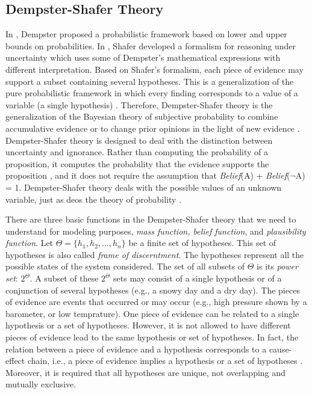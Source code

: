 \documentclass[11pt]{article}
\begin{document}
\subsection{Dempster-Shafer Theory}

In \cite{dempster:theory}, Dempster proposed a probabilistic framework based on
lower and upper bounds on probabilities. In \cite{shafer:evidence-theory},
Shafer developed a formalism for reasoning under uncertainty which uses some of
Dempster's mathematical expressions with different interpretation. Based on
Shafer's formalism, each piece of evidence may support a subset containing
several hypotheses. This is a generalization of the pure probabilistic framework
in which every finding corresponds to a value of a variable (a single
hypothesis) \cite{diez:reasoning-uncertainty}. Therefore, Dempster-Shafer theory
is the generalization of the Bayesian theory of subjective probability to
combine accumulative evidence or to change prior opinions in the light of new
evidence \cite{das:decision-making-agents}. Dempster-Shafer theory is designed
to deal with the distinction between uncertainty and ignorance. Rather than
computing the probability of a proposition, it computes the probability that the
evidence supports the proposition \cite{russell:ai-modern}, and it does not
require the assumption that \textit{Belief}(A) + \textit{Belief}($\neg$A) = 1.
Dempster-Shafer theory deals with the possible values of an unknown variable,
just as deos the theory of probability \cite{tanimoto:ai-lisp}.

There are three basic functions in the Dempster-Shafer theory that we need to
understand for modeling purposes, \textit{mass function, belief function}, and
\textit{plausibility function}. Let $\Theta=\{h_1,h_2, \ldots, h_n\}$ be a
finite set of hypotheses. This set of hypotheses is also called \textit{frame of
discerntment}. The hypotheses represent all the possible states of the system
considered. The set of all subsets of $\Theta$ is its \textit{power set}:
$2^\Theta$. A subset of these $2^\Theta$ sets may consist of a single hypothesis
or of a conjunction of several hypotheses (e.g., a snowy day and a dry day). The
pieces of evidence are events that occurred or may occur (e.g., high pressure
shown by a barometer, or low temprature). One piece of evidence can be related
to a single hypothesis or a set of hypotheses. However, it is not allowed to
have different pieces of evidence lead to the same hypothesis or set of
hypotheses. In fact, the relation between a piece of evidence and a hypothesis
corresponds to a cause-effect chain, i.e., a piece of evidence implies a
hypothesis or a set of hypotheses \cite{kay:dst-reliability}. Moreover, it is
required that all hypotheses are unique, not overlapping and mutually exclusive.
\end{document}
